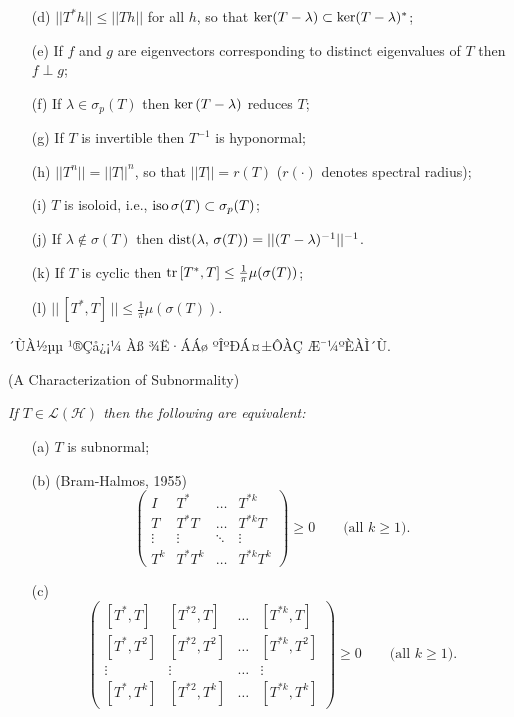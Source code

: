 \documentclass[12pt,a4paper,2sided]{article}
\newcommand{\vs}{\vspace}
\begin{document}
\newpage
{}

 \vspace{0.4cm}

{\sl \begin{itemize} \item[\rm(d)] $||T^*h||\le ||Th||$ for all $h$,
so that $\text{\rm ker}(T-\lambda)\subset \text{\rm
ker}(T-\lambda)^*$;
\item[\rm(e)] If $f$ and $g$ are eigenvectors corresponding to
distinct eigenvalues of $T$ then $f\perp g$; \item[\rm(f)] If
$\lambda\in\sigma_p(T)$ then $\text{\rm ker}\,(T-\lambda)$ reduces
$T$; \item[\rm(g)] If $T$ is invertible then $T^{-1}$ is hyponormal;
\item[\rm(h)]  $||T^n||=||T||^n$, so that
$||T||=r(T)$ {\rm (}$r(\cdot)$ denotes spectral radius{\rm )};
\item[\rm(i)] $T$ is isoloid, i.e., $\text{\rm
iso}\,\sigma(T)\subset \sigma_p(T)$; \item[\rm(j)] If $\lambda\notin
\sigma(T)$ then $\text{\rm dist}(\lambda,\,
\sigma(T))=||(T-\lambda)^{-1}||^{-1}$. \item[\rm(k)]  If $T$ is cyclic then $\text{\rm
tr}\,[T^*,T]\le\frac{1}{\pi}\mu(\sigma(T))$; \item[\rm(l)]  $||\,[T^*,T]\,||\le\frac{1}{\pi}
\mu(\sigma(T))$.
\end{itemize} }



´ÙÀ½µµ ¹®Çå¿¡¼­ Àß ¾Ë·ÁÁø ºÎºÐÁ¤±ÔÀÇ Æ¯¼ºÈ­ÀÌ´Ù.

\vs{0.3cm}{\bf Proposition 2.0.2.} {\rm (A Characterization of
Subnormality) \cite{Con2}}\label{thm3.5} {\sl If
$T\in\mathcal{L(H)}$ then the following are equivalent:
\begin{itemize}
\item[\rm(a)] $T$ is subnormal;
\item[\rm(b)] {\rm (Bram-Halmos, 1955)}
$$
\begin{pmatrix}
I&T^*&\hdots& T^{*k}\\
T& T^*T& \hdots& T^{*k}T\\
\vdots&\vdots& \ddots& \vdots\\
T^k& T^*T^k& \hdots& T ^{*k}T^k
\end{pmatrix}
\ge 0\qquad\text{(all $k\ge 1$)}.
$$
\item[\rm(c)]
$$
\begin{pmatrix}
[T^*,T]&[T^{*2},T]&\hdots&[T^{*k},T]\\
[T^*,T^2]&[T^{*2},T^2]&\hdots&[T^{*k},T^2]\\
\vdots&\vdots&\hdots&\vdots\\
[T^*,T^k]&[T^{*2},T^k]&\hdots&[T^{*k},T^k]
\end{pmatrix}
\ge 0\qquad\text{(all $k\ge 1$)}.
$$  \end{itemize}}
\end{document}
